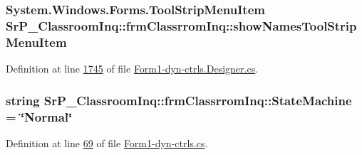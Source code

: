 \hypertarget{class_sr_p___classroom_inq_1_1frm_classrrom_inq_a128944d3506ac87f9278cc8917a9e6f0}{
\subsubsection[{show\-Names\-Tool\-Strip\-Menu\-Item}]{\setlength{\rightskip}{0pt plus 5cm}\-System.\-Windows.\-Forms.\-Tool\-Strip\-Menu\-Item {\bf \-Sr\-P\-\_\-\-Classroom\-Inq\-::frm\-Classrrom\-Inq\-::show\-Names\-Tool\-Strip\-Menu\-Item}}}
\label{class_sr_p___classroom_inq_1_1frm_classrrom_inq_a128944d3506ac87f9278cc8917a9e6f0}


\-Definition at line \hyperlink{_form1-dyn-ctrls_8_designer_8cs_source_l01745}{1745} of file \hyperlink{_form1-dyn-ctrls_8_designer_8cs_source}{\-Form1-\/dyn-\/ctrls.\-Designer.\-cs}.

\hypertarget{class_sr_p___classroom_inq_1_1frm_classrrom_inq_a4858c67d60a267f02e6c97085f2aee71}{
\subsubsection[{\-State\-Machine}]{\setlength{\rightskip}{0pt plus 5cm}string {\bf \-Sr\-P\-\_\-\-Classroom\-Inq\-::frm\-Classrrom\-Inq\-::\-State\-Machine} = \char`\"{}\-Normal\char`\"{}}}
\label{class_sr_p___classroom_inq_1_1frm_classrrom_inq_a4858c67d60a267f02e6c97085f2aee71}


\-Definition at line \hyperlink{_form1-dyn-ctrls_8cs_source_l00069}{69} of file \hyperlink{_form1-dyn-ctrls_8cs_source}{\-Form1-\/dyn-\/ctrls.\-cs}.

